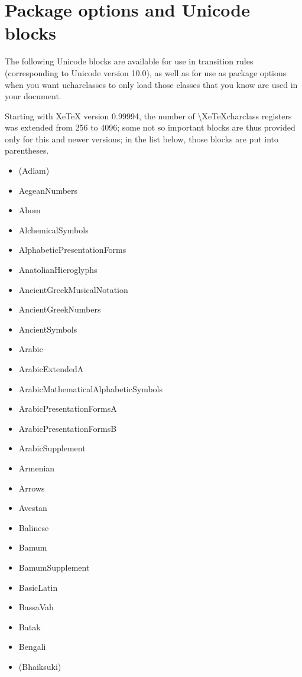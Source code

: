 ﻿\documentclass{article}
\newenvironment{itemlist}{%
  \begin{itemize}
	\setlength{\itemsep}{0pt}
	\setlength{\parsep}{0pt}
	\setlength{\topsep}{0pt}
	\setlength{\partopsep}{0pt}
	\setlength{\parskip}{0pt}
	\setlength{\labelsep}{5pt}}%
{
  \end{itemize}}
\begin{document}
	\section{Package options and Unicode blocks}

		The following Unicode blocks are available for use in transition rules (corresponding to Unicode version 10.0), as well as for use as package options when you want ucharclasses to only load those classes that you know are used in your document.

		Starting with XeTeX version 0.99994, the number of \textbackslash XeTeXcharclass registers was extended from 256 to 4096; some not so important blocks are thus provided only for this and newer versions; in the list below, those blocks are put into parentheses.

		\begin{multicols}{2}
			\begin{itemlist}
				\item (Adlam)
				\item AegeanNumbers
				\item Ahom
				\item AlchemicalSymbols
				\item AlphabeticPresentationForms
				\item AnatolianHieroglyphs
				\item AncientGreekMusicalNotation
				\item AncientGreekNumbers
				\item AncientSymbols
				\item Arabic
				\item ArabicExtendedA
				\item ArabicMathematicalAlphabeticSymbols
				\item ArabicPresentationFormsA
				\item ArabicPresentationFormsB
				\item ArabicSupplement
				\item Armenian
				\item Arrows
				\item Avestan
				\item Balinese
				\item Bamum
				\item BamumSupplement
				\item BasicLatin
				\item BassaVah
				\item Batak
				\item Bengali
				\item (Bhaiksuki)

\end{itemlist}
\end{multicols}
\end{document}
